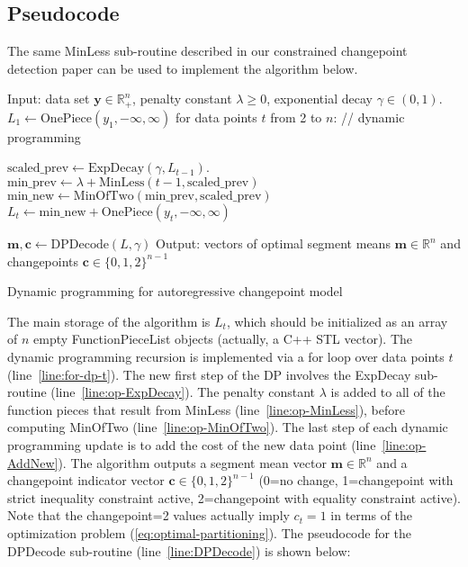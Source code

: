 \documentclass{article}
\newcommand{\RR}{\mathbb R}
\begin{document}
\subsection{Pseudocode}

The same MinLess sub-routine described in our constrained changepoint
detection paper can be used to implement the algorithm below. 
\begin{algorithm}[H]
\begin{algorithmic}[1]
\STATE Input: 
data set $\mathbf y\in\RR_+^n$, 
penalty constant $\lambda\geq 0$, 
exponential decay $\gamma\in(0,1)$.
\STATE $ L_{1}\gets \text{OnePiece}(y_1, -\infty, \infty)$
\label{line:init}
\STATE for data points $t$ from 2 to $n$: // dynamic programming
\label{line:for-dp-t}
\begin{ALC@g}
  \STATE $\text{scaled\_prev}\gets\text{ExpDecay}(\gamma, L_{t-1})$.
  \label{line:op-ExpDecay}
  \STATE $\text{min\_prev}\gets \lambda + 
  \text{MinLess}(t-1, \text{scaled\_prev})$
  \label{line:op-MinLess}
  \STATE $\text{min\_new}\gets
 \text{MinOfTwo}(\text{min\_prev},  \text{scaled\_prev})$
  \label{line:op-MinOfTwo}
  \STATE $L_{t}\gets \text{min\_new} + \text{OnePiece}(y_t, -\infty, \infty)$
  \label{line:op-AddNew}
\end{ALC@g}
\STATE $\mathbf m,\mathbf c\gets\text{DPDecode}(L,\gamma)$
\label{line:DPDecode}
\STATE Output: 
vectors of optimal segment means $\mathbf m\in\RR^{n}$ 
and changepoints $\mathbf c\in\{0,1,2\}^{n-1}$
\label{line:output}
\caption{\label{algo:dp}
Dynamic programming for autoregressive changepoint model}
\end{algorithmic}
\end{algorithm}

The main storage of the algorithm is $ L_{t}$, which should be
initialized as an array of $n$ empty FunctionPieceList objects
(actually, a C++ STL vector).  The dynamic programming recursion is
implemented via a for loop over data points $t$
(line~\ref{line:for-dp-t}). The new first step of the DP involves the
ExpDecay sub-routine (line~\ref{line:op-ExpDecay}). The penalty
constant $\lambda$ is added to all of the function pieces that result
from MinLess (line~\ref{line:op-MinLess}), before computing MinOfTwo
(line~\ref{line:op-MinOfTwo}). The last step of each dynamic
programming update is to add the cost of the new data point
(line~\ref{line:op-AddNew}).  The algorithm outputs a segment mean
vector $\mathbf m\in\RR^n$ and a changepoint indicator vector
$\mathbf c\in\{0,1,2\}^{n-1}$ (0=no change, 1=changepoint with strict
inequality constraint active, 2=changepoint with equality constraint
active). Note that the changepoint=2 values actually imply $c_t=1$ in
terms of the optimization problem (\ref{eq:optimal-partitioning}). The
pseudocode for the DPDecode sub-routine (line~\ref{line:DPDecode}) is
shown below:
\end{document}
